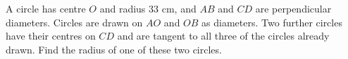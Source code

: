 A circle has centre $O$ and radius $33$ cm, and $AB$ and $CD$ are perpendicular diameters. Circles are drawn on $AO$ and $OB$ as diameters. Two further circles have their centres on $CD$ and are tangent to all three of the circles already drawn. Find the radius of one of these two circles.

